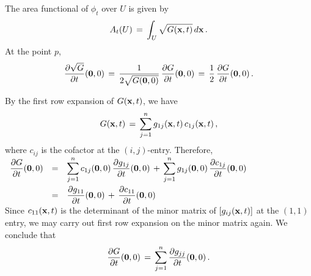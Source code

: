 \documentclass{article}[12pt,a4paper]
\begin{document}
The area functional of $\phi_t$ over $U$ is given by 
$$ A_t(U) \,=\, \int_U \sqrt{G({\bf x}, t)}\, d{\bf x}\,.$$
At the point $p$, 
$$ \frac{\partial \sqrt{G}}{\partial t}({\bf 0}, 0) \,=\, 
\frac{1}{2\sqrt{G({\bf 0}, 0)}}\, \frac{\partial G}{\partial t}({\bf 0}, 0) \,=\,
\frac{1}{2}\, \frac{\partial G}{\partial t}({\bf 0}, 0)\,. $$
\vspace*{0.1in}

By the first row expansion of $G({\bf x}, t)$, we have
$$ G({\bf x}, t) \,=\, \sum_{j=1}^n g_{1j}({\bf x}, t)\, c_{1j}({\bf x}, t) \,,$$
where $c_{ij}$ is the cofactor at the $(i,j)$-entry. Therefore, \\[0.1in]
$\begin{array}{rcl}
\displaystyle \frac{\partial G}{\partial t}({\bf 0}, 0) &=& \displaystyle 
	\sum_{j=1}^n c_{1j}({\bf 0}, 0) \, \frac{\partial g_{1j}}{\partial t}({\bf 0}, 0) 
	\,+\, \sum_{j=1}^n g_{1j}({\bf 0}, 0) \, \frac{\partial c_{1j}}{\partial t}({\bf 0}, 0) \\[0.2in]
&=& \displaystyle 
	\frac{\partial g_{11}}{\partial t}({\bf 0}, 0) \,+\, \frac{\partial c_{11}}{\partial t}({\bf 0}, 0) \\
\end{array} $ \\[0.2in]
Since $c_{11}({\bf x}, t)$ is the determinant of the minor matrix of $[g_{ij}({\bf x}, t)]$
at the $(1,1)$ entry, we may carry out first row expansion on the minor matrix again.
We conclude that 
\begin{equation}
\frac{\partial G}{\partial t}({\bf 0}, 0) \,=\, \sum_{j=1}^n \frac{\partial g_{jj}}{\partial t}({\bf 0}, 0) \,.
\end{equation}
\newpage
\end{document}

